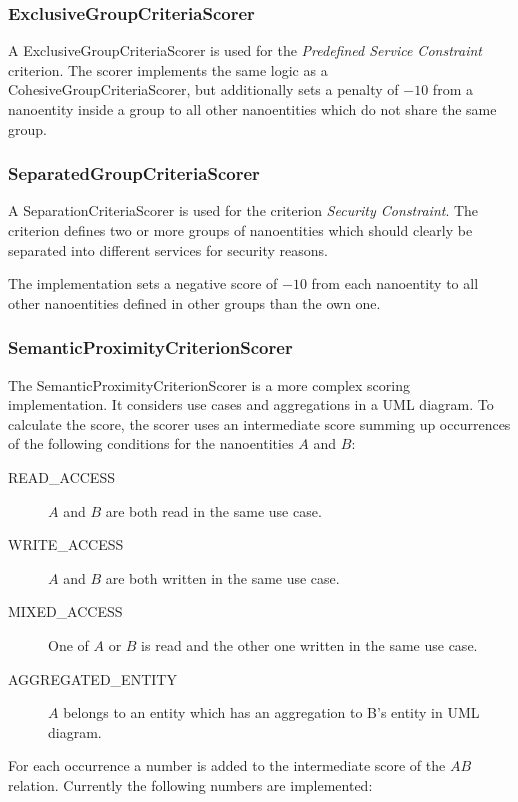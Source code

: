 \subsubsection{ExclusiveGroupCriteriaScorer}

A ExclusiveGroupCriteriaScorer is used for the \textit{Predefined Service Constraint} criterion. The scorer implements the same logic as a CohesiveGroupCriteriaScorer, but additionally sets a penalty of $-10$ from a nanoentity inside a group to all other nanoentities which do not share the same group.

\subsubsection{SeparatedGroupCriteriaScorer}

A SeparationCriteriaScorer is used for the criterion \textit{Security Constraint}. The criterion defines two or more groups of nanoentities which should clearly be separated into different services for security reasons. 

The implementation sets a negative score of $-10$ from each nanoentity to all other nanoentities defined in other groups than the own one. 

\subsubsection{SemanticProximityCriterionScorer}

The SemanticProximityCriterionScorer is a more complex scoring implementation. It considers use cases and aggregations in a UML diagram. To calculate the score, the scorer uses an intermediate score summing up occurrences of the following conditions for the nanoentities $A$ and $B$:

\begin{description}
	\item [READ\_ACCESS] $A$ and $B$ are both read in the same use case.
	\item [WRITE\_ACCESS] $A$ and $B$ are both written in the same use case.
	\item [MIXED\_ACCESS] One of $A$ or $B$ is read and the other one written in the same use case.
	\item [AGGREGATED\_ENTITY] $A$ belongs to an entity which has an aggregation to B's entity in UML diagram. 
\end{description}

For each occurrence a number is added to the intermediate score of the $AB$ relation. Currently the following numbers are implemented:

